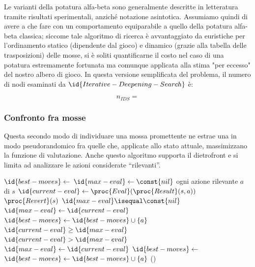 \documentclass{article}
\begin{document}
Le varianti della potatura alfa-beta sono generalmente descritte in letteratura
tramite risultati sperimentali, anziché notazione asintotica. Assumiamo quindi
di avere a che fare con un comportamento equiparabile a quello della potatura
alfa-beta classica; siccome tale algoritmo di ricerca è avvantaggiato da
euristiche per l'ordinamento statico (dipendente dal gioco) e dinamico (grazie
alla tabella delle trasposizioni) delle mosse, si è soliti quantificarne il
costo nel caso di una potatura estremamente fortunata ma comunque applicata
alla stima "per eccesso" del nostro albero di gioco. In questa versione
semplificata del problema, il numero di nodi esaminati da
$\id{Iterative-Deepening-Search}$ è:

\begin{equation}
  n_{IDS} = %
\end{equation}

\subsubsection{Confronto fra mosse}

Questa secondo modo di individuare una mossa promettente ne estrae una in modo
pseudorandomico fra quelle che, applicate allo stato attuale, massimizzano la
funzione di valutazione. Anche questo algoritmo supporta il dietrofront e si
limita ad analizzare le azioni considerate ``rilevanti''.

\begin{codebox}
  \li  $\id{best-moves} \gets$
       {\emph{}}
  \li  $\id{max-eval} \gets \const{nil}$
  \li \For ogni azione rilevante $a$ di $s$
  \li   \Do
          $\id{current-eval} \gets \proc{Eval}(\proc{Result}(s, a))$
  \li     $\proc{Revert}(s)$
  \li     \If $\id{max-eval} \isequal \const{nil}$
  \li       \Then
              $\id{max-eval} \gets \id{current-eval}$
  \li         $\id{best-moves} \gets \id{best-moves} \cup \{ a \}$
  \li     \ElseIf $\id{current-eval} \geq \id{max-eval}$
  \li       \Then
              \If $\id{current-eval} > \id{max-eval}$
  \li           \Then
                  $\id{max-eval} \gets \id{current-eval}$
  \li             $\id{best-moves} \gets$
                  {\emph{}}
                \End
  \li         $\id{best-moves} \gets \id{best-moves} \cup \{ a \}$
          \End
        \End
  \li  \Return {}()
\end{codebox}
\end{document}
